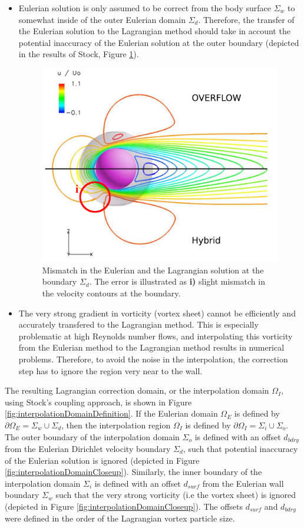 	\begin{itemize}
	\item Eulerian solution is only assumed to be correct from the body surface $\Sigma_w$ to somewhat inside of the outer Eulerian domain $\Sigma_d$. Therefore, the transfer of the Eulerian solution to the Lagrangian method should take in account the potential inaccuracy of the Eulerian solution at the outer boundary (depicted in the results of Stock, Figure \ref{fig:stockBoundaryErrorMod}).
	
		\begin{figure}[!b]
			\centering
			\includegraphics[width=0.5\linewidth]{figures/hybrid/stockBoundaryErrorMod.png}
			\caption{Mismatch in the Eulerian and the Lagrangian solution at the boundary $\Sigma_d$. The error is illustrated as \textbf{i)} slight mismatch in the velocity contours at the boundary.}
			\label{fig:stockBoundaryErrorMod}
		\end{figure}		
	
	\item The very strong gradient in vorticity (vortex sheet) cannot be efficiently and accurately transfered to the Lagrangian method. This is especially problematic at high Reynolds number flows, and interpolating this vorticity from the Eulerian method to the Lagrangian method results in numerical problems. Therefore, to avoid the noise in the interpolation, the correction step has to ignore the region very near to the wall.
	\end{itemize}
	
	The resulting Lagrangian correction domain, or the interpolation domain $\Omega_I$, using Stock's coupling approach, is shown in Figure \ref{fig:interpolationDomainDefinition}. If the Eulerian domain $\Omega_E$ is defined by $\partial\Omega_E=\Sigma_w \cup \Sigma_d$, then the interpolation region $\Omega_I$ is defined by $\partial\Omega_I = \Sigma_{i}\cup\Sigma_{o}$. The outer boundary of the interpolation domain $\Sigma_o$ is defined with an offset $d_{bdry}$ from the Eulerian Dirichlet velocity boundary $\Sigma_d$, such that potential inaccuracy of the Eulerian solution is ignored (depicted in Figure \ref{fig:interpolationDomainCloseup}). Similarly, the inner boundary of the interpolation domain $\Sigma_i$ is defined with an offset $d_{surf}$ from the Eulerian wall boundary $\Sigma_w$ such that the very strong vorticity (i.e the vortex sheet) is ignored (depicted in Figure \ref{fig:interpolationDomainCloseup}). The offsets $d_{surf}$ and $d_{bdry}$ were defined in the order of the Lagrangian vortex particle size.
	
